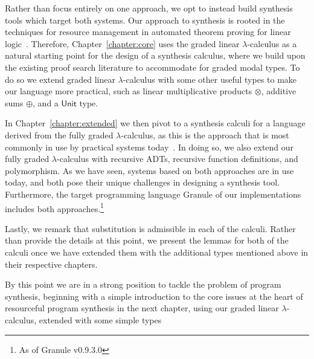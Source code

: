 Rather than focus entirely on one approach, we opt to instead build synthesis
tools which target both systems. Our approach to synthesis is rooted in the
techniques for resource management in automated theorem proving for linear
logic~\citep{HODAS1994327, CERVESATO2000133}. Therefore,
Chapter~\ref{chapter:core} uses the graded linear $\lambda$-calculus as a
natural starting point for the design of a synthesis calculus, where we build
upon the existing proof search literature to accommodate for graded modal types.
To do so we extend graded linear $\lambda$-calculus with some other useful types
to make our language more practical, such as linear multiplicative products
$\otimes$, additive sums $\oplus$, and a $\mathsf{Unit}$ type.

In Chapter~\ref{chapter:extended} we then pivot to a synthesis calculi for a
language derived from the fully graded $\lambda$-calculus, as this is the
approach that is most commonly in use by practical systems
today~\citep{DBLP:journals/corr/abs-2104-00480,
DBLP:journals/pacmpl/BernardyBNJS18}. In doing so, we also extend our fully graded
$\lambda$-calculus with recursive ADTs, recursive function definitions, and
polymorphism. As we have seen, systems based on both approaches are in use
today, and both pose their unique challenges in designing a synthesis tool.
Furthermore, the target programming language Granule of our implementations
includes both approaches.\footnote{As of Granule v0.9.3.0}

\label{ref:substitution}
Lastly, we remark that substitution is admissible in each of the calculi. Rather
than provide the details at this point, we present the lemmas for
both of the calculi once we have extended them with the additional types
mentioned above in their respective chapters.

By this point we are in a strong position to tackle the problem of program
synthesis, beginning with a simple introduction to the core issues at the heart
of resourceful program synthesis in the next chapter, using our graded linear
$\lambda$-calculus, extended with some simple types 
